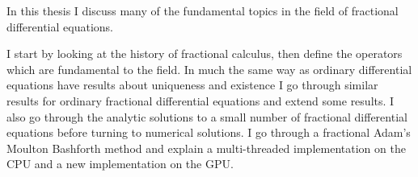 In this thesis I discuss many of the fundamental topics in the field of fractional differential equations. 


I start by looking at the history of fractional calculus, then define the operators which are fundamental to the field. In much the same way as ordinary differential equations have results about uniqueness and existence I go through similar results for ordinary fractional differential equations and extend some results. I also go through the analytic solutions to a small number of fractional differential equations before turning to numerical solutions. I go through a fractional Adam's Moulton Bashforth method and explain a multi-threaded implementation on the CPU and a new implementation on the GPU. 


